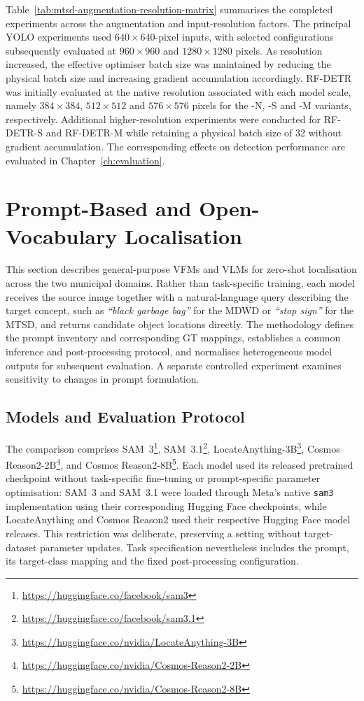 \noindent Table~\ref{tab:mtsd-augmentation-resolution-matrix} summarises the completed experiments across the augmentation and input-resolution factors. The principal \gls{YOLO} experiments used \(640 \times 640\)-pixel inputs, with selected configurations subsequently evaluated at \(960 \times 960\) and \(1280 \times 1280\) pixels. As resolution increased, the effective optimiser batch size was maintained by reducing the physical batch size and increasing gradient accumulation accordingly. \gls{RF-DETR} was initially evaluated at the native resolution associated with each model scale, namely \(384 \times 384\), \(512 \times 512\) and \(576 \times 576\) pixels for the -N, -S and -M variants, respectively. Additional higher-resolution experiments were conducted for \gls{RF-DETR}-S and \gls{RF-DETR}-M while retaining a physical batch size of 32 without gradient accumulation. The corresponding effects on detection performance are evaluated in Chapter~\ref{ch:evaluation}.

\newpage
\section{Prompt-Based and Open-Vocabulary Localisation}
\label{sec:prompt-methodology}
This section describes general-purpose \glspl{VFM} and \glspl{VLM} for zero-shot localisation across the two municipal domains. Rather than task-specific training, each model receives the source image together with a natural-language query describing the target concept, such as \emph{``black garbage bag''} for the \gls{MDWD} or \emph{``stop sign''} for the \gls{MTSD}, and returns candidate object locations directly. The methodology defines the prompt inventory and corresponding \gls{GT} mappings, establishes a common inference and post-processing protocol, and normalises heterogeneous model outputs for subsequent evaluation. A separate controlled experiment examines sensitivity to changes in prompt formulation.

\subsection{Models and Evaluation Protocol}
\label{sec:prompt-models-protocol}
The comparison comprises \gls{SAM}~3\footnote{\url{https://huggingface.co/facebook/sam3}},
\gls{SAM}~3.1\footnote{\url{https://huggingface.co/facebook/sam3.1}},
LocateAnything-3B\footnote{\url{https://huggingface.co/nvidia/LocateAnything-3B}},
Cosmos Reason2-2B\footnote{\url{https://huggingface.co/nvidia/Cosmos-Reason2-2B}},
and Cosmos Reason2-8B\footnote{\url{https://huggingface.co/nvidia/Cosmos-Reason2-8B}}.
Each model used its released pretrained checkpoint without task-specific fine-tuning or prompt-specific parameter optimisation: \gls{SAM}~3 and \gls{SAM}~3.1 were loaded through Meta's native \texttt{sam3} implementation using their corresponding Hugging Face checkpoints, while LocateAnything and Cosmos Reason2 used their respective Hugging Face model releases. This restriction was deliberate, preserving a setting without target-dataset parameter updates. Task specification nevertheless includes the prompt, its target-class mapping and the fixed post-processing configuration.


